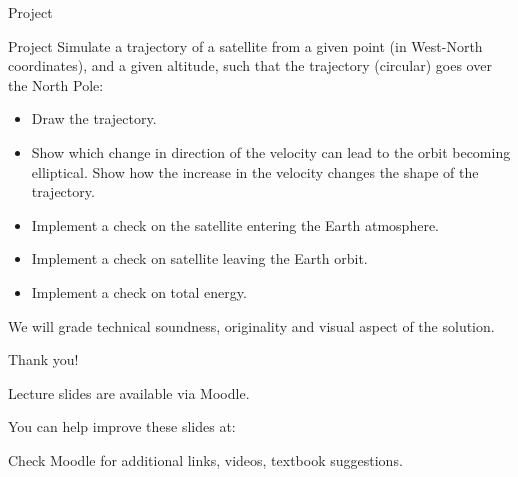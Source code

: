 \documentclass{beamer}
\begin{document}
\begin{frame}{Project}
	\begin{flushleft}
		
		\begin{block}{Project}
			Simulate a trajectory of a satellite from a given point (in West-North coordinates), and a given altitude, such that the trajectory (circular) goes over the North Pole:
			
			\begin{itemize}
				\item Draw the trajectory.
				
				\item Show which change in direction of the velocity can lead to the orbit becoming elliptical. Show how the increase in the velocity changes the shape of the trajectory.
				
				\item Implement a check on the satellite entering the Earth atmosphere.
				
				\item Implement a check on satellite leaving the Earth orbit.
				
				\item Implement a check on total energy.
				
			\end{itemize}
		\end{block}
	We will grade technical soundness, originality and visual aspect of the solution.
		
	\end{flushleft}
\end{frame}


\begin{frame}{Thank you!}
\centerline{Lecture slides are available via Moodle.}
\bigskip
\centerline{You can help improve these slides at:}
\centerline{\mygit}
\bigskip
\centerline{Check Moodle for additional links, videos, textbook suggestions.}
\bigskip

\centerline{\textcolor{black}{}}

\end{frame}
\end{document}
